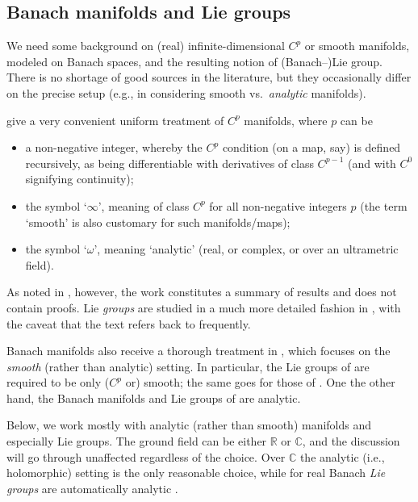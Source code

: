 \documentclass[pdftex]{sigma}
\numberwithin{equation}{section}
\newcommand\bC{{\mathbb C}}
\newcommand\bR{{\mathbb R}}
\begin{document}
\subsection{Banach manifolds and Lie groups}\label{subse:banmf}

We need some background on (real) infinite-dimensional $C^p$ or smooth manifolds, modeled on Banach spaces, and the resulting notion of (Banach--)Lie group. There is no shortage of good sources in the literature, but they occasionally differ on the precise setup (e.g., in considering smooth vs.\ {\it analytic} manifolds).

\cite{bourb-vars-17,bourb-vars-8-15} give a very convenient uniform treatment of $C^p$ manifolds, where $p$ can be
\begin{itemize}\itemsep=0pt
\item a non-negative integer, whereby the $C^p$ condition (on a map, say) is defined recursively, as being differentiable with derivatives of class $C^{p-1}$ (and with $C^0$ signifying continuity);

\item the symbol `$\infty$', meaning of class $C^p$ for all non-negative integers $p$ (the term `smooth' is also customary for such manifolds/maps);

\item the symbol `$\omega$', meaning `analytic' (real, or complex, or over an ultrametric field).
\end{itemize}
As noted in \cite[Avertissement]{bourb-vars-17}, however, the work constitutes a summary of results and does not contain proofs. Lie {\it groups} are studied in a much more detailed fashion in \cite[Chapter III]{bourb-lie-13}, with the caveat that the text refers back to \cite{bourb-vars-17,bourb-vars-8-15} frequently.

Banach manifolds also receive a thorough treatment in \cite{lang-fund}, which focuses on the {\it smooth} (rather than analytic) setting. In particular, the Lie groups of \cite[Section~VI.5]{lang-fund} are required to be only ($C^p$ or) smooth; the same goes for those of \cite[Definition IV.1]{neeb-inf}. One the other hand, the Banach manifolds \cite[Section~3]{upm-ban} and Lie groups of \cite[Section~6]{upm-ban} are analytic.

Below, we work mostly with analytic (rather than smooth) manifolds and especially Lie groups. The ground field can be either $\bR$ or $\bC$, and the discussion will go through unaffected regardless of the choice. Over $\bC$ the analytic (i.e., holomorphic) setting is the only reasonable choice, while for real Banach {\it Lie groups} are automatically analytic \cite[Corollary IV.1.10]{neeb-lc}.
\end{document}
